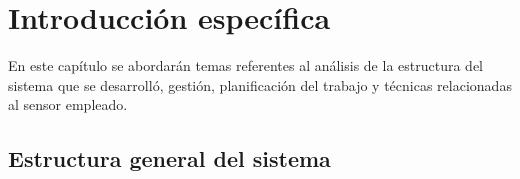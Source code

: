 \chapter{Introducción específica} %

\label{Chapter2}

En este capítulo se abordarán temas referentes al análisis de la estructura del sistema que se desarrolló, gestión, planificación del trabajo y técnicas relacionadas al sensor empleado.  	 

\section{Estructura general del sistema}
\label{sec:estructgeneralsistema}


 
